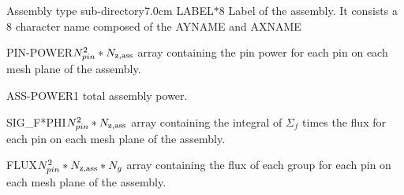 \begin{DescriptionEnregistrement}{Assembly type sub-directory}{7.0cm}
\CharEnr
  {LABEL}{$*8$}
  {Label of the assembly. It consists a 8 character name composed of the AYNAME and AXNAME}

\RealEnr
  {PIN-POWER}{$N_{pin}^2*N_{\rm z,ass}$}{}
  {array containing the pin power for each pin on each mesh plane of the assembly.}

\RealEnr
  {ASS-POWER}{1}{}
  {total assembly power.}

\RealEnr
  {SIG\_F*PHI}{$N_{pin}^2*N_{\rm z,ass}$}{}
  {array containing the integral of $\Sigma_f$  times the flux for each pin on each mesh plane of the assembly.}

\RealEnr
  {FLUX}{$N_{pin}^2*N_{\rm z,ass}*N_g$}{}
  {array containing the flux of each group for each pin on each mesh plane of the assembly.}

\end{DescriptionEnregistrement}

\clearpage

